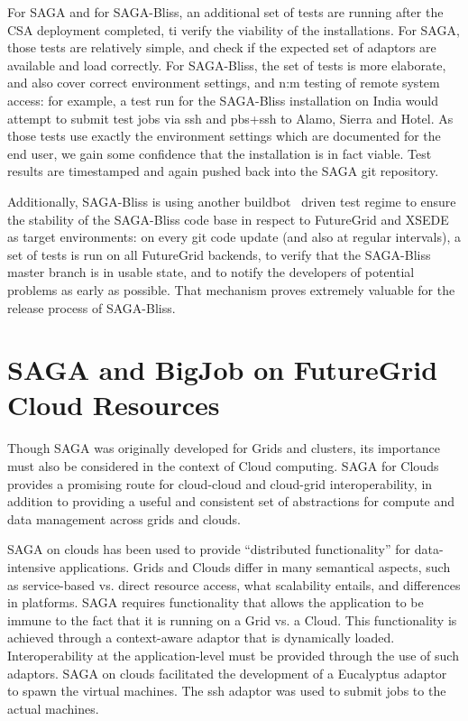 \documentclass[]{paper}
\begin{document}
For SAGA and for SAGA-Bliss, an additional set of tests are running after
the CSA deployment completed, ti verify the viability of the
installations.  For SAGA, those tests are relatively simple, and check
if the expected set of adaptors are available and load correctly.  For
SAGA-Bliss, the set of tests is more elaborate, and also cover correct
environment settings, and n:m testing of remote system access: for
example, a test run for the SAGA-Bliss installation on India would attempt
to submit test jobs via ssh and pbs+ssh to Alamo, Sierra and Hotel.
As those tests use exactly the environment settings which are
documented for the end user, we gain some confidence that the
installation is in fact viable.  Test results are timestamped and
again pushed back into the SAGA git repository.

Additionally, SAGA-Bliss is using another buildbot~\cite{bliss-builbot}
driven test regime to ensure the stability of the SAGA-Bliss code base in
respect to FutureGrid and XSEDE as target environments: on every git
code update (and also at regular intervals), a set of tests is run on
all FutureGrid backends, to verify that the SAGA-Bliss master branch is in
usable state, and to notify the developers of potential problems as
early as possible.  That mechanism proves extremely valuable for the
release process of SAGA-Bliss.


\section{SAGA and BigJob on FutureGrid Cloud Resources}

Though SAGA was originally developed for Grids and clusters, its importance must also be considered in the context of Cloud computing. SAGA for Clouds provides a promising route for cloud-cloud and cloud-grid interoperability, in addition to providing a useful and consistent set of abstractions for compute and data management across grids and clouds.

SAGA on clouds has been used to provide %
``distributed functionality'' for data-intensive applications. Grids and Clouds differ in many semantical aspects, such as service-based vs. direct resource access, what scalability entails, and differences in platforms. SAGA requires functionality that allows the application to be immune to the fact that it is running on a Grid vs. a Cloud. This functionality is achieved through a context-aware adaptor that is dynamically loaded. Interoperability at the application-level must be provided through the use of such adaptors. SAGA on clouds facilitated the development of a Eucalyptus adaptor to spawn the virtual machines. The ssh adaptor was used to submit jobs to the actual machines. 
\end{document}
